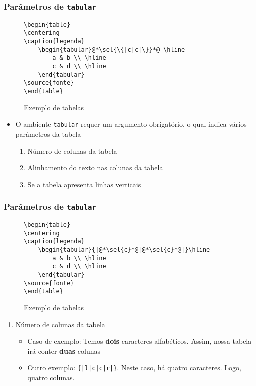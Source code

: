 \begin{frame}[fragile] \frametitle{Parâmetros de \texttt{tabular}}
\vspace{-0.5cm}
\begin{figure}[!t]
\caption{Exemplo de tabelas}
\begin{lstlisting}
\begin{table}
\centering
\caption{legenda}
	\begin{tabular}@*\sel{\{|c|c|\}}*@ \hline
		a & b \\ \hline
		c & d \\ \hline
	\end{tabular}
\source{fonte}
\end{table}
\end{lstlisting}
\ownsrc
\end{figure}

\begin{itemize}
	\item O ambiente \texttt{tabular} requer um argumento obrigatório, o qual indica vários parâmetros da tabela
	\begin{enumerate}
		\item Número de colunas da tabela
		\item Alinhamento do texto nas colunas da tabela
		\item Se a tabela apresenta linhas verticais
	\end{enumerate}
\end{itemize}
\end{frame}

\begin{frame}[fragile] \frametitle{Parâmetros de \texttt{tabular}}
\vspace{-0.5cm}
\begin{figure}[!t]
\caption{Exemplo de tabelas}
\begin{lstlisting}
\begin{table}
\centering
\caption{legenda}
	\begin{tabular}{|@*\sel{c}*@|@*\sel{c}*@|}\hline
		a & b \\ \hline
		c & d \\ \hline
	\end{tabular}
\source{fonte}
\end{table}
\end{lstlisting}
\ownsrc
\end{figure}

\begin{enumerate}
	\item Número de colunas da tabela
	\begin{itemize}
		\item Caso de exemplo: Temos \textbf{dois} caracteres alfabéticos. Assim, nossa tabela irá conter \textbf{duas} colunas
		\item Outro exemplo: \texttt{\{|l|c|c|r|\}}. Neste caso, há quatro caracteres. Logo, quatro colunas.
	\end{itemize}
\end{enumerate}

\end{frame}

